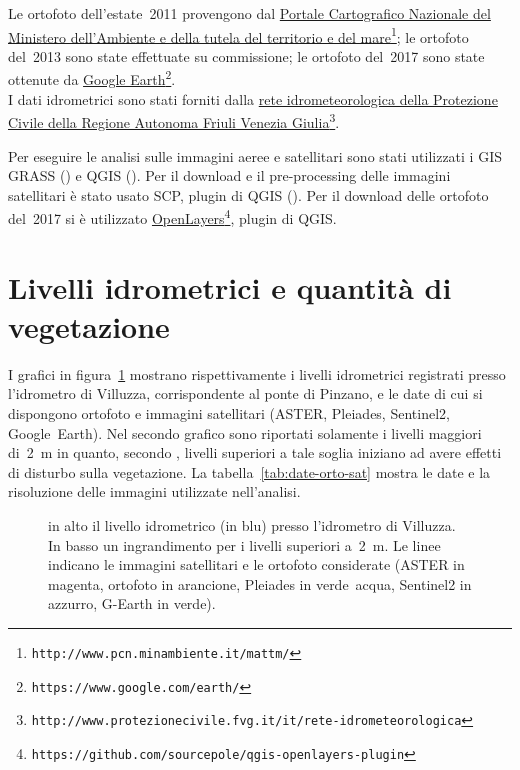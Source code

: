 \documentclass[12pt,a4paper]{article}
\begin{document}
Le ortofoto dell'estate~2011 provengono dal \href{http://www.pcn.minambiente.it/mattm/}{Portale Cartografico Nazionale del Ministero dell'Ambiente e della tutela del territorio e del mare}\footnote{\texttt{http://www.pcn.minambiente.it/mattm/}};
le ortofoto del~2013 sono state effettuate su commissione; 
%
%
le ortofoto del~2017 sono state ottenute da \href{https://www.google.com/earth/}{Google Earth}\footnote{\texttt{https://www.google.com/earth/}}.
\\
I dati idrometrici sono stati forniti dalla \href{http://www.protezionecivile.fvg.it/it/rete-idrometeorologica}{rete idrometeorologica della Protezione Civile della Regione Autonoma Friuli Venezia Giulia}\footnote{\texttt{http://www.protezionecivile.fvg.it/it/rete-idrometeorologica}}.


\medskip
Per eseguire le analisi sulle immagini aeree e satellitari sono stati utilizzati i GIS GRASS (\cite{soft:GRASS}) e QGIS (\cite{soft:QGIS}). Per il download e il pre-processing delle immagini satellitari è stato usato SCP, plugin di QGIS (\cite{soft:SCP}). Per il download delle ortofoto del~2017 si è utilizzato \href{https://github.com/sourcepole/qgis-openlayers-plugin}{OpenLayers}\footnote{\texttt{https://github.com/sourcepole/qgis-openlayers-plugin}}, plugin di QGIS.


\section{Livelli idrometrici e quantità di vegetazione}
I grafici in figura~\ref{graph:livelli-orto-sat} mostrano rispettivamente i livelli idrometrici registrati presso l'idrometro di Villuzza, corrispondente al ponte di Pinzano, e le date di cui si dispongono ortofoto e immagini satellitari (ASTER, Pleiades, Sentinel2, Google~Earth). 
Nel secondo grafico sono riportati solamente i livelli maggiori di~\SI{2}{\m} in quanto, secondo \cite{Bertoldi:2009-2m}, livelli superiori a tale soglia iniziano ad avere effetti di disturbo sulla vegetazione.
La tabella~\ref{tab:date-orto-sat} mostra le date e la risoluzione delle immagini utilizzate nell'analisi.

\begin{figure}[ht]
	\centering
	
	
	\caption[livelli idrometrici e foto aeree - satellitari]{in alto il livello idrometrico (in blu) presso l'idrometro di Villuzza. 
	In basso un ingrandimento per i livelli superiori a~\SI{2}{\m}. Le linee indicano le immagini satellitari e le ortofoto considerate (ASTER in magenta, ortofoto in arancione, Pleiades in verde~acqua, Sentinel2 in azzurro, G-Earth in verde).}
	\label{graph:livelli-orto-sat}
\end{figure}
\end{document}
